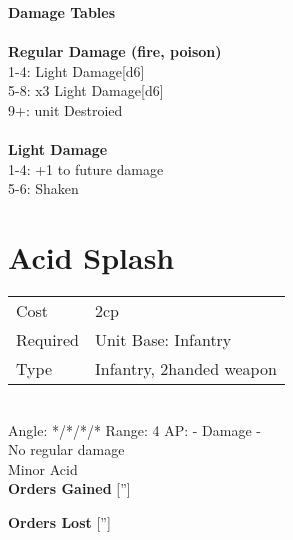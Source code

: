 {\bf Damage Tables} \\
\ \\ {\bf Regular Damage (fire, poison) } \\
1-4: Light Damage[d6] \\
5-8: x3 Light Damage[d6] \\
9+: unit Destroied \\
\ \\ {\bf Light Damage } \\
1-4: +1 to future damage \\
5-6: Shaken \\









\pagebreak\section{ Acid Splash }

\begin{tabular}{ll}
    Cost & 2cp \\
    Required & Unit Base: Infantry\\
    Type & Infantry, 2handed weapon\\
\end{tabular}
\ \\
\indent Angle: */*/*/* Range: 4  AP: - Damage - \\
No regular damage\\ Minor Acid
\ \\

{\bf Orders Gained}
['']

{\bf Orders Lost}
['']
